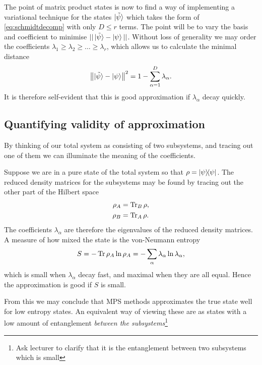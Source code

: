 \documentclass[a4paper]{article}
\begin{document}
The point of matrix product states is now to find a way of implementing
a variational technique for the  states $\ket{\tilde{\psi}}$
which takes the form of \eqref{eq:schmidtdecomp} with only $D\leq r$ terms. The
point will be to vary the basis and coefficient to minimise
$||\ket{\tilde{\psi}}-\ket{\psi}||$.
Without loss of generality we may order the coefficients $\lambda_1\geq
\lambda_2\geq\dots \geq \lambda_r$, which allows us to calculate the minimal
distance
\[ 
\left\lVert\ket{\tilde{\psi}}-\ket{\psi}\right\rVert^2=1-\sum_{\alpha=1}^D \lambda_\alpha.
\]
It is therefore self-evident that this is good approximation if $\lambda_\alpha$ decay quickly.

\subsection{Quantifying validity of approximation}
By thinking of our total system as consisting of two subsystems, and tracing out
one of them we can illuminate the meaning of the coefficients.
\begin{center}
\end{center}
Suppose we are in a pure state of the total system so that
$\rho=\ket{\psi}\!\!\bra{\psi}$. The reduced density matrices for the subsystems may
be found by tracing out the other part of the Hilbert space 
\begin{align*}
\rho_A&=\operatorname{Tr}_B \rho,\\
\rho_B&=\operatorname{Tr}_A \rho.
\end{align*}
The coefficients $\lambda_\alpha$ are therefore the eigenvalues of the reduced density matrices.
A measure of how mixed the state is the von-Neumann entropy
\[S= - \operatorname{Tr} \rho_A\ln \rho_A=-\sum_\alpha \lambda_\alpha \ln \lambda_\alpha,\]
which is small when $\lambda_\alpha$ decay fast, and maximal when they are all
equal. Hence the approximation is good if $S$ is small.
\begin{remark}
From this we may conclude that MPS methods approximates the true state well for
low entropy states. An equivalent way of viewing these are as states with a low
amount of entanglement \emph{between the subsystems}\footnote{Ask lecturer to
clarify that it is the entanglement between two subsystems which is small}
\end{remark}
\end{document}
